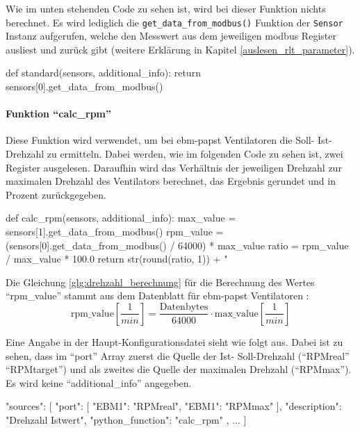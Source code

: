 Wie im unten stehenden Code zu sehen ist, wird bei dieser Funktion nichts berechnet. Es wird lediglich die \lstinline{get_data_from_modbus()} Funktion der \lstinline{Sensor} Instanz aufgerufen, welche den Messwert aus dem jeweiligen \gls{modbus} Register ausliest und zurück gibt (weitere Erklärung in Kapitel \ref{auslesen_rlt_parameter}).

\begin{pythoncode}
def standard(sensors, additional_info):
	return sensors[0].get_data_from_modbus()
\end{pythoncode}


\paragraph{Funktion \enquote{calc\_rpm}}
Diese Funktion wird verwendet, um bei ebm-papst Ventilatoren die Soll- \bzw Ist-Drehzahl zu ermitteln. Dabei werden, wie im folgenden Code zu sehen ist, zwei Register ausgelesen. Daraufhin wird das Verhältnis der jeweiligen Drehzahl zur maximalen Drehzahl des Ventilators berechnet, das Ergebnis gerundet und in Prozent zurückgegeben.

\begin{pythoncode}
def calc_rpm(sensors, additional_info):
	max_value = sensors[1].get_data_from_modbus()
	rpm_value = (sensors[0].get_data_from_modbus() / 64000) * max_value
	ratio = rpm_value / max_value * 100.0
	return str(round(ratio, 1)) + " %
\end{pythoncode}

Die Gleichung \eqref{glg:drehzahl_berechnung} für die Berechnung des Wertes \enquote{rpm\_value} stammt aus dem Datenblatt für ebm-papst Ventilatoren \cite[vgl.][118,122]{ebmpapst:2020}: 
\begin{equation}
	\text{rpm\_value}\left[\frac{1}{min}\right] = \frac{\text{Datenbytes}}{64000} \cdot \text{max\_value} \left[\frac{1}{min}\right]
	\label{glg:drehzahl_berechnung}
\end{equation} 

Eine Angabe in der Haupt-Konfigurationsdatei sieht wie folgt aus. Dabei ist zu sehen, dass im \enquote{port} Array zuerst die Quelle der Ist- \bzw Soll-Drehzahl (\enquote{RPMreal} \bzw \enquote{RPMtarget}) und als zweites die Quelle der maximalen Drehzahl (\enquote{RPMmax}). Es wird keine \enquote{additional\_info} angegeben.

\begin{jsoncode}
"sources": [
	{
		"port": [
			{"EBM1": "RPMreal"},
			{"EBM1": "RPMmax"}
		],
		"description": "Drehzahl Istwert",
		"python_function": "calc_rpm"
	},
	...
]
\end{jsoncode}



